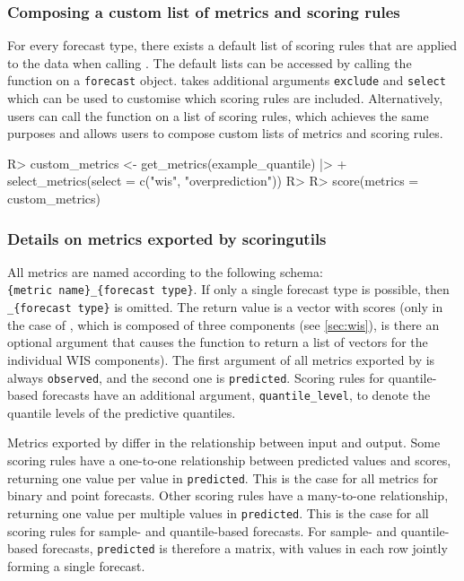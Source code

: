 \documentclass[
]{jss}
\begin{document}
\subsubsection{Composing a custom list of metrics and scoring
rules}\label{composing-a-custom-list-of-metrics-and-scoring-rules}

For every forecast type, there exists a default list of scoring rules
that are applied to the data when calling . The default
lists can be accessed by calling the function  on a
\texttt{forecast} object.  takes additional
arguments \texttt{exclude} and \texttt{select} which can be used to
customise which scoring rules are included. Alternatively, users can
call the function  on a list of scoring rules,
which achieves the same purposes and allows users to compose custom
lists of metrics and scoring rules.

\begin{CodeChunk}
\begin{CodeInput}
R> custom_metrics <- get_metrics(example_quantile) |>
+   select_metrics(select = c("wis", "overprediction"))
R> 
R> score(metrics = custom_metrics)
\end{CodeInput}
\end{CodeChunk}

\subsubsection{Details on metrics exported by scoringutils}

All metrics are named according to the following schema:
\texttt{\{metric\ name\}\_\{forecast\ type\}}. If only a single forecast
type is possible, then \texttt{\_\{forecast\ type\}} is omitted. The
return value is a vector with scores (only in the case of ,
which is composed of three components (see \ref{sec:wis}), is there an
optional argument that causes the function to return a list of vectors
for the individual WIS components). The first argument of all metrics
exported by  is always \texttt{observed}, and the
second one is \texttt{predicted}. Scoring rules for quantile-based
forecasts have an additional argument, \texttt{quantile\_level}, to
denote the quantile levels of the predictive quantiles.

Metrics exported by  differ in the relationship
between input and output. Some scoring rules have a one-to-one
relationship between predicted values and scores, returning one value
per value in \texttt{predicted}. This is the case for all metrics for
binary and point forecasts. Other scoring rules have a many-to-one
relationship, returning one value per multiple values in
\texttt{predicted}. This is the case for all scoring rules for sample-
and quantile-based forecasts. For sample- and quantile-based forecasts,
\texttt{predicted} is therefore a matrix, with values in each row
jointly forming a single forecast.
\end{document}
